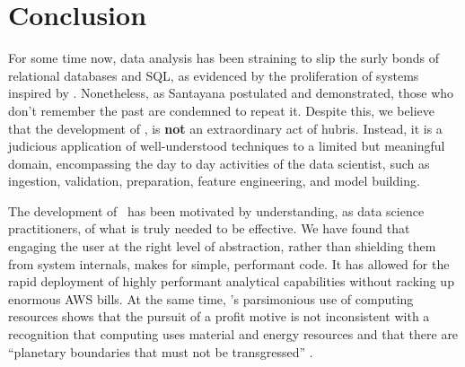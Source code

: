 \section{Conclusion}
\label{end}

For some time now, data analysis has been straining to 
slip the surly bonds of relational databases and SQL, as evidenced by the proliferation of systems
inspired by \cite{mapreduce2004}. Nonetheless, as Santayana postulated and \cite{antihadoop2009} demonstrated,
those who don't remember the past are condemned to repeat it.
Despite this, we believe that the development of \Q, is {\bf not} an
extraordinary act of hubris. Instead, it is a judicious application of
well-understood techniques to a limited but meaningful domain, encompassing
the day to day activities of the data scientist, such as 
ingestion, validation, preparation, feature engineering, and model building.

The development of \Q\ has been motivated by understanding, as data 
science practitioners, of what is truly needed to be
effective. We have found that engaging the user at the right level of abstraction, rather than shielding them from
system internals, makes for simple, performant code. It has allowed for the
rapid deployment of highly performant analytical capabilities without racking up
enormous AWS bills.
At the same time, \Q's
parsimonious use of computing resources shows that the pursuit of a profit
motive is not inconsistent with a recognition that computing uses 
material and energy resources \cite{Schumacher,Limits2018} and that there are 
``planetary boundaries that must not be transgressed'' \cite{Rockstrom2009}.

